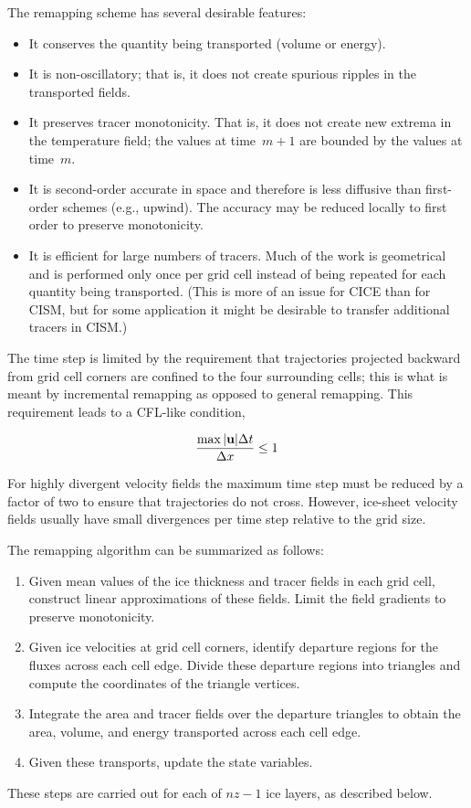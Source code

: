 The remapping scheme has several desirable features:
\begin{itemize}
\item It conserves the quantity being transported (volume or energy).
\item It is non-oscillatory; that is, it does not create spurious
      ripples in the transported fields.
\item It preserves tracer monotonicity.  That is, it does not create
      new extrema in the temperature field; the values
      at time~$m+1$ are bounded by the values at time~$m$.
\item It is second-order accurate in space and therefore is
      less diffusive than first-order schemes (e.g., upwind).
      The accuracy may be reduced locally to first order to preserve monotonicity.
\item It is efficient for large numbers of tracers.
      Much of the work is geometrical and is performed
      only once per grid cell instead of being repeated for each
      quantity being transported.  (This is more of an issue for CICE than
      for CISM, but for some application it might be desirable to transfer 
      additional tracers in CISM.)
\end{itemize}
The time step is limited by the requirement that trajectories
projected backward from grid cell corners are confined to the four
surrounding cells; this is what is meant by incremental
remapping as opposed to general remapping. This requirement leads to a 
CFL-like condition, 

\begin{equation}
  \frac{\max|{\bf u}|\Delta t} {\Delta x} \leq 1 
\end{equation}

For highly divergent velocity fields the maximum time
step must be reduced by a factor of two to ensure that
trajectories do not cross.  However, ice-sheet velocity fields
usually have small divergences per time step relative to the grid size.

The remapping algorithm can be summarized as follows:
\begin{enumerate}
\item Given mean values of the ice thickness and tracer fields in each
      grid cell, construct linear approximations of these fields.
      Limit the field gradients to preserve monotonicity.
\item Given ice velocities at grid cell corners, identify departure
      regions for the fluxes across each cell edge.  Divide these
      departure regions into triangles and compute the coordinates
      of the triangle vertices.
\item Integrate the area and tracer fields over the departure triangles to obtain
      the area, volume, and energy transported across each cell edge.
\item Given these transports, update the state variables.
\end{enumerate}
These steps are carried out for each of $nz-1$ ice layers, as described below.

